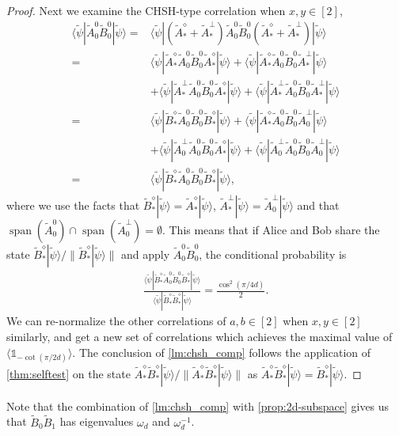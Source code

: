 \documentclass[11pt,letterpaper]{article}
\newcommand{\ket}[1]{|#1\rangle}
\newcommand{\bra}[1]{\langle#1|}
\DeclareMathOperator{\spn}{span}
\newcommand{\1}{\mathbb{1}}
\newcommand{\tA}{\tilde{A}}
\newcommand{\tB}{\tilde{B}}
\newcommand{\tpsi}{\tilde{\psi}}
\theoremstyle{definition}
\begin{document}
\begin{proof}
Next we examine the CHSH-type correlation when $x,y \in [2]$,
\begin{align*}
	   \bra{\tpsi} \tA_0^0\tB_0^0 \ket{\tpsi} 
	= &\bra{\tpsi}(\tA_\ast^\diamond + \tA_\ast^\perp) \tA_0^0\tB_0^0 (\tA_\ast^\diamond + \tA_\ast^\perp)\ket{\tpsi} \\
	= & \bra{\tpsi}\tA_\ast^\diamond \tA_0^0\tB_0^0 \tA_\ast^\diamond\ket{\tpsi} + \bra{\tpsi}\tA_\ast^\diamond \tA_0^0\tB_0^0 \tA_\ast^\perp\ket{\tpsi} \\
	&+\bra{\tpsi}\tA_\ast^\perp \tA_0^0\tB_0^0 \tA_\ast^\diamond\ket{\tpsi} + \bra{\tpsi}\tA_\ast^\perp \tA_0^0\tB_0^0 \tA_\ast^\perp\ket{\tpsi}\\
	= & \bra{\tpsi}\tB_\ast^\diamond \tA_0^0\tB_0^0 \tB_\ast^\diamond\ket{\tpsi} + \bra{\tpsi}\tA_\ast^\diamond \tA_0^0\tB_0^0 \tA_0^\perp\ket{\tpsi} \\
	&+\bra{\tpsi}\tA_0^\perp \tA_0^0\tB_0^0 \tA_\ast^\diamond\ket{\tpsi} + \bra{\tpsi}\tA_0^\perp \tA_0^0\tB_0^0 \tA_0^\perp\ket{\tpsi}\\
	=&\bra{\tpsi}\tB_\ast^\diamond \tA_0^0\tB_0^0 \tB_\ast^\diamond\ket{\tpsi},
\end{align*}
where we use the facts that $\tB_\ast^\diamond \ket{\tpsi} = \tA_\ast^\diamond \ket{\tpsi}$, $\tA_\ast^\perp \ket{\tpsi} = \tA_0^\perp \ket{\tpsi}$ and that 
$\spn(\tA_0^0) \cap \spn(\tA_0^\perp) = \emptyset$. 
This means that if Alice and Bob share the state $\tB_\ast^\diamond \ket{\tpsi}/\|\tB_\ast^\diamond \ket{\tpsi}\|$ and apply 
$\tA_0^0\tB_0^0$, the conditional probability is
\begin{align}
	\frac{\bra{\tpsi}\tB_\ast^\diamond \tA_0^0\tB_0^0 \tB_\ast^\diamond\ket{\tpsi}}{\bra{\tpsi} \tB_\ast^\diamond \tB_\ast^\diamond \ket{\tpsi}} = \frac{\cos^2(\pi/4d)}{2}.
\end{align} 
We can re-normalize the other correlations of $a,b \in [2]$ when $x,y \in [2]$ similarly, and get a new set of correlations 
which achieves the maximal value of $\langle \1_{-\cot(\pi/2d)}\rangle$. 
The conclusion of \cref{lm:chsh_comp} follows the application of \cref{thm:selftest} on the state $\tA_\ast^\diamond\tB_\ast^\diamond \ket{\tpsi}/\|\tA_\ast^\diamond\tB_\ast^\diamond \ket{\tpsi}\|$ as $\tA_\ast^\diamond\tB_\ast^\diamond \ket{\tpsi} = \tB_\ast^\diamond \ket{\tpsi}$.
\end{proof}
Note that the combination of \cref{lm:chsh_comp} with \cref{prop:2d-subspace} gives us that 
$\tB_0\tB_1$ has eigenvalues $\omega_d$ and $\omega_d^{-1}$.
\end{document}
